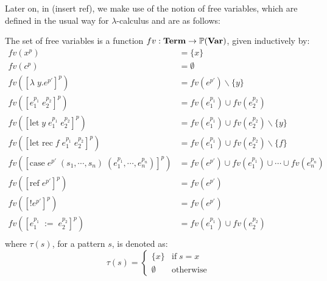 \documentclass[../../master.tex]{subfiles}
\begin{document}

Later on, in (insert ref), we make use of the notion of free variables, which are defined in the usual way for $\lambda$-calculus and are as follows:
\begin{definition}\label{def:fv}
	The set of free variables is a function $fv:\textbf{Term}\rightarrow\mathbb{P}(\textbf{Var})$, given inductively by:
	\begin{align*}
		fv(x^p)&=\{x\}\\
		fv(c^p)&=\emptyset\\
		fv([\lambda\;y.e^{p'}]^p)&=fv(e^{p'})\backslash\{y\}\\
		fv([e_1^{p_1}\;e_2^{p_2}]^p)&=fv(e_1^{p_1})\cup fv(e_2^{p_2})\\
		fv([\mbox{let}\;y\;e_1^{p_1}\;e_2^{p_2}]^p)&=fv(e_1^{p_1})\cup fv(e_2^{p_2})\backslash\{y\}\\
		fv([\mbox{let rec}\;f\;e_1^{p_1}\;e_2^{p_2}]^p)&=fv(e_1^{p_1})\cup fv(e_2^{p_2})\backslash\{f\}\\
		fv([\mbox{case}\;e^{p'}\;(s_1,\cdots,s_n)\;(e_1^{p_1},\cdots,e_n^{p_n})]^p)&=fv(e^{p'})\cup fv(e_1^{p_1})\cup\cdots\cup fv(e_n^{p_n})\\
		fv([\mbox{ref}\;e^{p'}]^p)&=fv(e^{p'})\\
		fv([!e^{p'}]^p)&=fv(e^{p'})\\
		fv([e_1^{p_1}\;:=\;e_2^{p_2}]^p)&=fv(e_1^{p_1})\cup fv(e_2^{p_2})\\
	\end{align*}
	where $\tau(s)$, for a pattern $s$, is denoted as:
	$$
	\tau(s)=
		\left\{\begin{matrix}
			\{x\} & \mbox{if}\;s=x\\ 
			\emptyset & \mbox{otherwise}
		\end{matrix}\right.
	$$
\end{definition}
\end{document}
